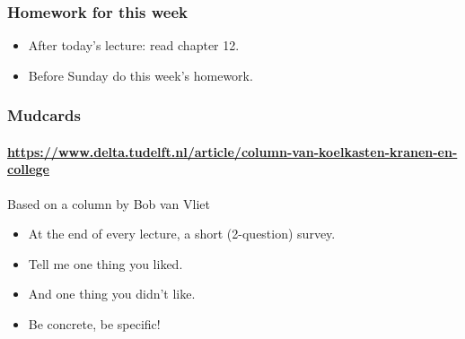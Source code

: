 
\begin{frame}
	\frametitle{Homework for this week}
	\begin{itemize}[<+->]
		\item \alert{After} today's lecture: read chapter 12.
		\item \alert{Before} Sunday do this week's homework.
	\end{itemize}
\end{frame}

\begin{frame}
	\frametitle{Mudcards}
	\framesubtitle{\url{https://www.delta.tudelft.nl/article/column-van-koelkasten-kranen-en-college}}

	\begin{block}{Based on a column by Bob van Vliet}
		\begin{itemize}
			\item At the end of every lecture, a short (2-question) survey.
			\item Tell me one thing you liked.
			\item And one thing you didn't like.
			\item Be concrete, be specific!
		\end{itemize}
	\end{block}
\end{frame}


